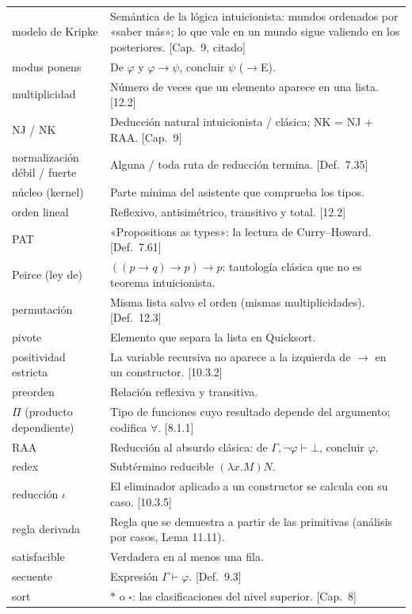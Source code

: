 \documentclass[11pt,a4paper]{article}
\begin{document}
{\begin{longtable}{@{}p{}p{}@{}}
modelo de Kripke & Semántica de la lógica intuicionista: mundos ordenados por «saber más»; lo que vale en un mundo sigue valiendo en los posteriores. [Cap.\ 9, citado]\\
modus ponens & De \(\varphi\) y \(\varphi\to\psi\), concluir \(\psi\) (\(\to\)E).\\
multiplicidad & Número de veces que un elemento aparece en una lista. [12.2]\\
NJ / NK & Deducción natural intuicionista / clásica; NK = NJ + RAA. [Cap.\ 9]\\
normalización débil / fuerte & Alguna / toda ruta de reducción termina. [Def.\ 7.35]\\
núcleo (kernel) & Parte mínima del asistente que comprueba los tipos.\\
orden lineal & Reflexivo, antisimétrico, transitivo y total. [12.2]\\
PAT & «Propositions as types»: la lectura de Curry--Howard. [Def.\ 7.61]\\
Peirce (ley de) & \(((p\to q)\to p)\to p\): tautología clásica que no es teorema intuicionista.\\
permutación & Misma lista salvo el orden (mismas multiplicidades). [Def.\ 12.3]\\
pivote & Elemento que separa la lista en Quicksort.\\
positividad estricta & La variable recursiva no aparece a la izquierda de \(\to\) en un constructor. [10.3.2]\\
preorden & Relación reflexiva y transitiva.\\
\(\Pi\) (producto dependiente) & Tipo de funciones cuyo resultado depende del argumento; codifica \(\forall\). [8.1.1]\\
RAA & Reducción al absurdo clásica: de \(\Gamma,\neg\varphi\vdash\bot\), concluir \(\varphi\).\\
redex & Subtérmino reducible \((\lambda x.M)N\).\\
reducción \(\iota\) & El eliminador aplicado a un constructor se calcula con su caso. [10.3.5]\\
regla derivada & Regla que se demuestra a partir de las primitivas (análisis por casos, Lema 11.11).\\
satisfacible & Verdadera en al menos una fila.\\
secuente & Expresión \(\Gamma\vdash\varphi\). [Def.\ 9.3]\\
sort & \(*\) o \(\square\): las clasificaciones del nivel superior. [Cap.\ 8]\\

\end{longtable}}
\end{document}
